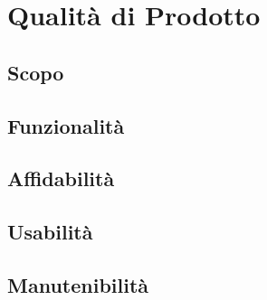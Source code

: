 \section{Qualità di Prodotto}

\subsection{Scopo}

\subsection{Funzionalità}
\subsection{Affidabilità}
\subsection{Usabilità}
\subsection{Manutenibilità}